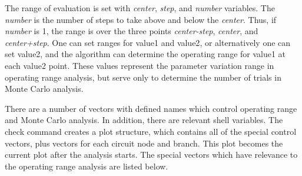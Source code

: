 The range of evaluation is set with {\it center\/}, {\it step\/}, and
{\it number\/} variables.  The {\it number\/} is the number of steps
to take above and below the {\it center\/}.  Thus, if {\it number\/}
is 1, the range is over the three points {\it center-step\/}, {\it
center\/}, and {\it center+step\/}.  One can set ranges for {\et
value1} and {\et value2}, or alternatively one can set {\et value2},
and the algorithm can determine the operating range for {\et value1}
at each {\et value2} point.  These values represent the parameter
variation range in operating range analysis, but serve only to
determine the number of trials in Monte Carlo analysis.

There are a number of vectors with defined names which control
operating range and Monte Carlo analysis.  In addition, there are
relevant shell variables.  The {\cb check} command creates a plot
structure, which contains all of the special control vectors, plus
vectors for each circuit node and branch.  This plot becomes the
current plot after the analysis starts.  The special vectors which
have relevance to the operating range analysis are listed below.

